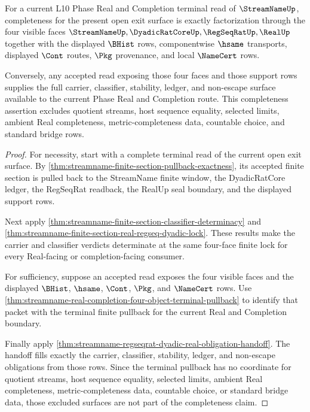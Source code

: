 \begin{theorem}
\label{thm:streamname-four-face-terminal-completeness}
For a current L10 Phase Real and Completion terminal read of
$\StreamNameUp$, completeness for the present open exit surface is exactly
factorization through the four visible faces
$\StreamNameUp,\DyadicRatCoreUp,\RegSeqRatUp,\RealUp$ together with the
displayed $\BHist$ rows, componentwise $\hsame$ transports, displayed
$\Cont$ routes, $\Pkg$ provenance, and local $\NameCert$ rows.

Conversely, any accepted read exposing those four faces and those support
rows supplies the full carrier, classifier, stability, ledger, and
non-escape surface available to the current Phase Real and Completion route.
This completeness assertion excludes quotient streams, host sequence
equality, selected limits, ambient Real completeness, metric-completeness
data, countable choice, and standard bridge rows.
\end{theorem}
\begin{proof}
For necessity, start with a complete terminal read of the current open exit
surface. By
\autoref{thm:streamname-finite-section-pullback-exactness}, its accepted
finite section is pulled back to the StreamName finite window, the
DyadicRatCore ledger, the RegSeqRat readback, the RealUp seal boundary, and
the displayed support rows.

Next apply \autoref{thm:streamname-finite-section-classifier-determinacy}
and \autoref{thm:streamname-finite-section-real-regseq-dyadic-lock}. These
results make the carrier and classifier verdicts determinate at the same
four-face finite lock for every Real-facing or completion-facing consumer.

For sufficiency, suppose an accepted read exposes the four visible faces and
the displayed $\BHist$, $\hsame$, $\Cont$, $\Pkg$, and $\NameCert$ rows.
Use \autoref{thm:streamname-real-completion-four-object-terminal-pullback} to
identify that packet with the terminal finite pullback for the current Real
and Completion boundary.

Finally apply
\autoref{thm:streamname-regseqrat-dyadic-real-obligation-handoff}. The handoff
fills exactly the carrier, classifier, stability, ledger, and non-escape
obligations from those rows. Since the terminal pullback has no coordinate
for quotient streams, host sequence equality, selected limits, ambient Real
completeness, metric-completeness data, countable choice, or standard bridge
data, those excluded surfaces are not part of the completeness claim.
\end{proof}

